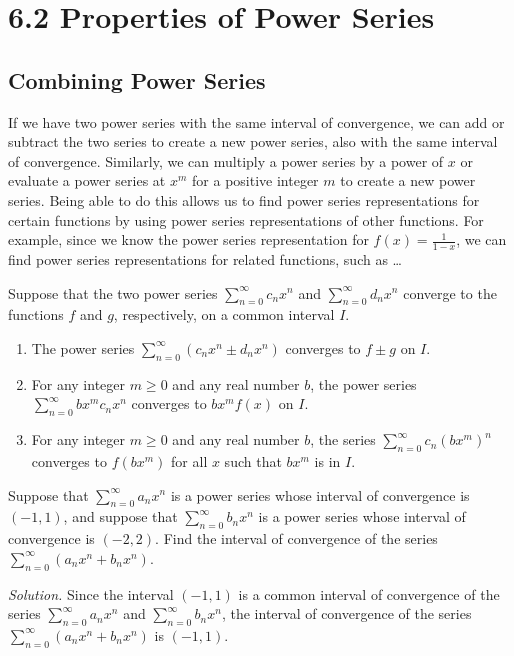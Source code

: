 \documentclass{report}
\begin{document}
    \pagebreak \bigbreak \noindent 
    \section*{6.2 Properties of Power Series}
    \bigbreak \noindent 
    \subsection*{Combining Power Series}
    \bigbreak \noindent 
    If we have two power series with the same interval of convergence, we can add or subtract the two series to create a new power series, also with the same interval of convergence. Similarly, we can multiply a power series by a power of \( x \) or evaluate a power series at \( x^m \) for a positive integer \( m \) to create a new power series. Being able to do this allows us to find power series representations for certain functions by using power series representations of other functions. For example, since we know the power series representation for \( f(x) = \frac{1}{1-x} \), we can find power series representations for related functions, such as \ldots

    \bigbreak \noindent 

    \begin{thrmm}
        Suppose that the two power series \(\sum_{n=0}^{\infty} c_n x^n\) and \(\sum_{n=0}^{\infty} d_n x^n\) converge to the functions \(f\) and \(g\), respectively, on a common interval \(I\).
    \begin{enumerate}[label=(\roman*)]
        \item The power series \(\sum_{n=0}^{\infty} (c_n x^n \pm d_n x^n)\) converges to \(f \pm g\) on \(I\).
        \item For any integer \(m \geq 0\) and any real number \(b\), the power series \(\sum_{n=0}^{\infty} b x^m c_n x^n\) converges to \(b x^m f(x)\) on \(I\).
        \item For any integer \(m \geq 0\) and any real number \(b\), the series \(\sum_{n=0}^{\infty} c_n (b x^m)^n\) converges to \(f(b x^m)\) for all \(x\) such that \(b x^m\) is in \(I\).
    \end{enumerate}
    \end{thrmm}

    \bigbreak \noindent 
    \begin{exm}
       Suppose that \(\sum_{n=0}^{\infty} a_n x^n\) is a power series whose interval of convergence is \((-1, 1)\), and suppose that \(\sum_{n=0}^{\infty} b_n x^n\) is a power series whose interval of convergence is \((-2, 2)\).
       \bigbreak \noindent 
       Find the interval of convergence of the series \(\sum_{n=0}^{\infty} (a_n x^n + b_n x^n)\).
    \end{exm}
    \bigbreak \noindent 
    \textit{Solution.} Since the interval \((-1, 1)\) is a common interval of convergence of the series \(\sum_{n=0}^{\infty} a_n x^n\) and \(\sum_{n=0}^{\infty} b_n x^n\), the interval of convergence of the series \(\sum_{n=0}^{\infty} (a_n x^n + b_n x^n)\) is \((-1, 1)\).
\end{document}
